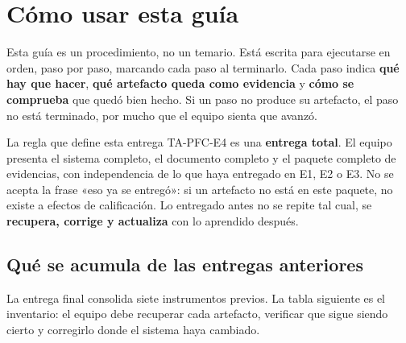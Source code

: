 \documentclass[11pt,a4paper]{article}
\begin{document}
	\tableofcontents
	\newpage
	
	\section{Cómo usar esta guía}
	
	Esta guía es un procedimiento, no un temario. Está escrita para ejecutarse en orden, paso por paso, marcando cada paso al terminarlo. Cada paso indica \textbf{qué hay que hacer}, \textbf{qué artefacto queda como evidencia} y \textbf{cómo se comprueba} que quedó bien hecho. Si un paso no produce su artefacto, el paso no está terminado, por mucho que el equipo sienta que avanzó.
	
	\begin{uteqbox}{La regla que define esta entrega}
		TA-PFC-E4 es una \textbf{entrega total}. El equipo presenta el sistema completo, el documento completo y el paquete completo de evidencias, con independencia de lo que haya entregado en E1, E2 o E3. No se acepta la frase «eso ya se entregó»: si un artefacto no está en este paquete, no existe a efectos de calificación. Lo entregado antes no se repite tal cual, se \textbf{recupera, corrige y actualiza} con lo aprendido después.
	\end{uteqbox}
	
	\subsection{Qué se acumula de las entregas anteriores}
	
	La entrega final consolida siete instrumentos previos. La tabla siguiente es el inventario: el equipo debe recuperar cada artefacto, verificar que sigue siendo cierto y corregirlo donde el sistema haya cambiado.
	
\end{document}
